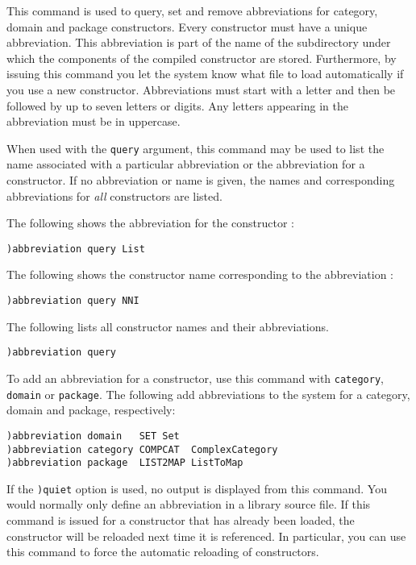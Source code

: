 \par{}

This command is used to query, set and remove abbreviations for category,
domain and package constructors.
Every constructor must have a unique abbreviation.
This abbreviation is part of the name of the subdirectory
under which the components of the compiled constructor are
stored.
Furthermore, by issuing this command you
let the system know what file to load automatically if you use a new
constructor.
Abbreviations must start with a letter and then be followed by
up to seven letters or digits.
Any letters appearing in the abbreviation must be in uppercase.

When used with the {\tt query} argument,
this command may be used to list the name
associated with a  particular abbreviation or the  abbreviation for a
constructor.
If no abbreviation or name is given, the names and corresponding
abbreviations for {\it all} constructors are listed.

The following shows the abbreviation for the constructor :
\begin{verbatim}
)abbreviation query List
\end{verbatim}
The following shows the constructor name corresponding to the
abbreviation :
\begin{verbatim}
)abbreviation query NNI
\end{verbatim}
The following lists all constructor names and their abbreviations.
\begin{verbatim}
)abbreviation query
\end{verbatim}

To add an abbreviation for a constructor, use this command with
{\tt category}, {\tt domain} or {\tt package}.
The following add abbreviations to the system for a
category, domain and package, respectively:
\begin{verbatim}
)abbreviation domain   SET Set
)abbreviation category COMPCAT  ComplexCategory
)abbreviation package  LIST2MAP ListToMap
\end{verbatim}
If the {\tt )quiet} option is used,
no output is displayed from this command.
You would normally only define an abbreviation in a library source file.
If this command is issued for a constructor that has already been loaded, the
constructor will be reloaded next time it is referenced.  In particular, you
can use this command to force the automatic reloading of constructors.

